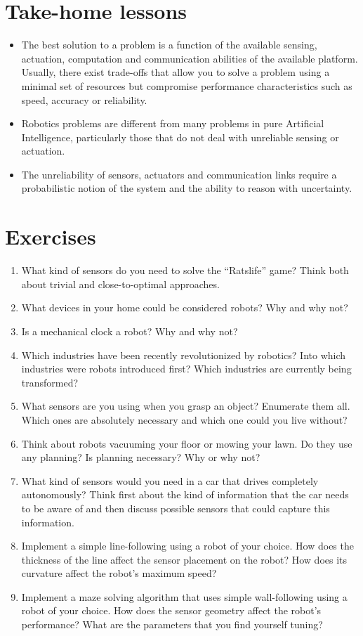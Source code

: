 \section*{Take-home lessons}
\begin{itemize}
\item The best solution to a problem is a function of the available sensing, actuation, computation and communication abilities of the available platform. Usually, there exist trade-offs that allow you to solve a problem using a minimal set of resources but compromise performance characteristics such as speed, accuracy or reliability.
\item Robotics problems are different from many problems in pure Artificial Intelligence, particularly those that do not deal with unreliable sensing or actuation.
\item The unreliability of sensors, actuators and communication links require a probabilistic notion of the system and the ability to reason with uncertainty.
\end{itemize}

\section*{Exercises}\small
\begin{enumerate}
\item What kind of sensors do you need to solve the ``Ratslife'' game? Think both about trivial and close-to-optimal approaches.
\item What devices in your home could be considered robots? Why and why not?
\item Is a mechanical clock a robot? Why and why not?
\item Which industries have been recently revolutionized by robotics? Into which industries were robots introduced first? Which industries are currently being transformed?
\item What sensors are you using when you grasp an object? Enumerate them all. Which ones are absolutely necessary and which one could you live without?
\item Think about robots vacuuming your floor or mowing your lawn. Do they use any planning? Is planning necessary? Why or why not?
\item What kind of sensors would you need in a car that drives completely autonomously? Think first about the kind of information that the car needs to be aware of and then discuss possible sensors that could capture this information.
\item Implement a simple line-following using a robot of your choice. How does the thickness of the line affect the sensor placement on the robot? How does its curvature affect the robot's maximum speed?
\item Implement a maze solving algorithm that uses simple wall-following using a robot of your choice. How does the sensor geometry affect the robot's performance? What are the parameters that you find yourself tuning?
\end{enumerate}\normalsize

